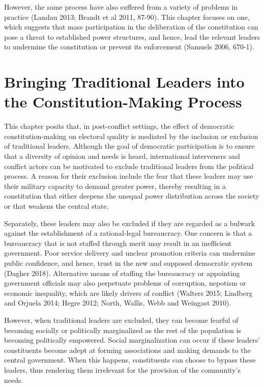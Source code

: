 \documentclass [11pt]{article}
\begin{document}
However, the same process have also suffered from a variety of problems in practice (Landau 2013; Brandt et al 2011, 87-90). This chapter focuses on one, which suggests that mass participation in the deliberation of the constitution can pose a threat to established power structures, and hence, lead the relevant leaders to undermine the constitution or prevent its enforcement (Samuels 2006, 670-1).

\section*{Bringing Traditional Leaders into the Constitution-Making Process}

This chapter posits that, in post-conflict settings, the effect of democratic constitution-making on electoral quality is mediated by the inclusion or exclusion of traditional leaders. Although the goal of democratic participation is to ensure that a diversity of opinion and needs is heard, international interveners and conflict actors can be motivated to exclude traditional leaders from the political process. A reason for their exclusion include the fear that these leaders may use their military capacity to demand greater power, thereby resulting in a constitution that either deepens the unequal power distribution across the society or that weakens the central state.

Separately, these leaders may also be excluded if they are regarded as a bulwark against the establishment of a rational-legal bureaucracy. One concern is that a bureaucracy that is not staffed through merit may result in an inefficient government. Poor service delivery and unclear promotion criteria can undermine public confidence, and hence, trust in the new and supposed democratic system (Dagher 2018). Alternative means of staffing the bureaucracy or appointing government officials may also perpetuate problems of corruption, nepotism or economic inequality, which are likely drivers of conflict (Walters 2015; Lindberg and Orjuela 2014; Hegre 2012; North, Wallis, Webb and Weingast 2010).

However, when traditional leaders are excluded, they can become fearful of becoming socially or politically marginalized as the rest of the population is becoming politically empowered. Social marginalization can occur if these leaders' constituents become adept at forming associations and making demands to the central government. When this happens, constituents can choose to bypass these leaders, thus rendering them irrelevant for the provision of the community's needs.
\end{document}
